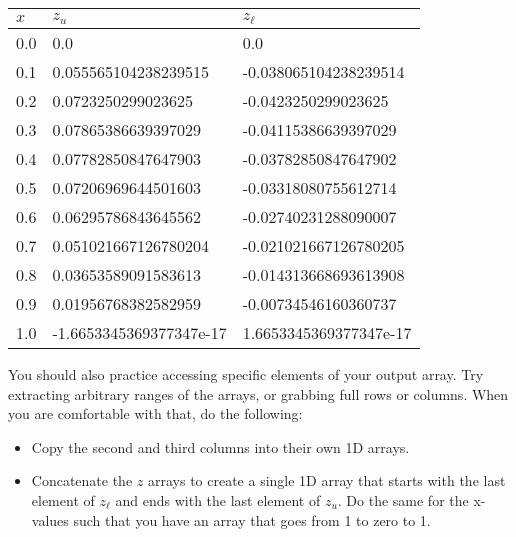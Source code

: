 \documentclass{article}%
\begin{document}
\renewcommand{\arraystretch}{1.2}
\begin{tabular}{ l | l | l}
$x$ & $z_u$ & $z_\ell$\\
\hline
0.0 & 0.0 & 0.0 \\
0.1 & 0.055565104238239515 & -0.038065104238239514 \\
0.2 & 0.0723250299023625 & -0.0423250299023625 \\
0.3 & 0.07865386639397029 & -0.04115386639397029 \\
0.4 & 0.07782850847647903 & -0.03782850847647902 \\
0.5 & 0.07206969644501603 & -0.03318080755612714 \\
0.6 & 0.06295786843645562 & -0.02740231288090007 \\
0.7 & 0.051021667126780204 & -0.021021667126780205 \\
0.8 & 0.03653589091583613 & -0.014313668693613908 \\
0.9 & 0.01956768382582959 & -0.00734546160360737 \\
1.0 & -1.6653345369377347e-17 & 1.6653345369377347e-17 \\
\hline
\end{tabular}

\bigskip

You should also practice accessing specific elements of your output array. Try extracting arbitrary ranges of the arrays, or grabbing full rows or columns.  When you are comfortable with that, do the following:
\begin{itemize}
	\item Copy the second and third columns into their own 1D arrays.
	\item Concatenate the $z$ arrays to create a single 1D array that starts with the last element of $z_\ell$ and ends with the last element of $z_u$. Do the same for the x-values such that you have an array that goes from 1 to zero to 1.
\end{itemize}
\end{document}

